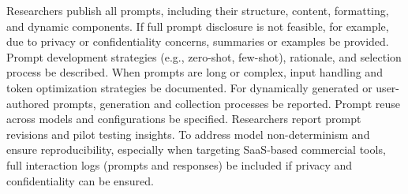 Researchers \must publish all prompts, including their structure, content, formatting, and dynamic components. If full prompt disclosure is not feasible, for example, due to privacy or confidentiality concerns, summaries or examples \should be provided. Prompt development strategies (e.g., zero-shot, few-shot), rationale, and selection process \must be described. When prompts are long or complex, input handling and token optimization strategies \must be documented. For dynamically generated or user-authored prompts, generation and collection processes \must be reported. Prompt reuse across models and configurations \must be specified. Researchers \should report prompt revisions and pilot testing insights. To address model non-determinism and ensure reproducibility, especially when targeting SaaS-based commercial tools, full interaction logs (prompts and responses) \should be included if privacy and confidentiality can be ensured.